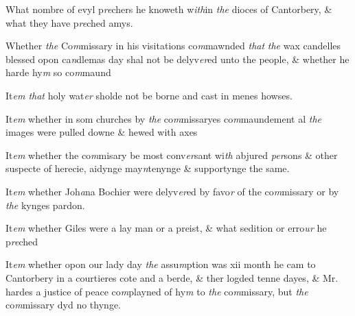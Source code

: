 \documentclass[12pt, a4paper]{book}
\begin{document}
				
					
		\ifthenelse{\isodd{\thepage}}
		{\reversemarginpar}
		{\normalmarginpar}
		What nombre of evyl p\textit{re}chers he knoweth w\textit{ith}in \textit{the} dioces of
						Cantorbery, \& what they have p\textit{re}ched amys.
				
		\ifthenelse{\isodd{\thepage}}
		{\reversemarginpar}
		{\normalmarginpar}
		Whether \textit{the} Co\textit{m}missary in his visitations co\textit{m}mawnded \textit{that}
               \textit{the} wax candelles blessed opon ca\textit{n}dlemas day shal not be
 delyv\textit{er}ed unto the people, \& whether he harde hy\textit{m} so co\textit{m}maund
			

		\ifthenelse{\isodd{\thepage}}
		{\reversemarginpar}
		{\normalmarginpar}
		 It\textit{em that} holy wat\textit{er} sholde not be borne and cast in menes howses.
 
		\ifthenelse{\isodd{\thepage}}
		{\reversemarginpar}
		{\normalmarginpar}
		It\textit{em} whether in som churches by \textit{the} co\textit{m}missaryes co\textit{m}maundement al \textit{the} images were pulled downe \& hewed with
 axes
 
		\ifthenelse{\isodd{\thepage}}
		{\reversemarginpar}
		{\normalmarginpar}
		It\textit{em} whether the co\textit{m}misary be most conv\textit{er}sant wi\textit{th} abjured
 \textit{per}sons \& other suspecte of herecie, aidynge may\textit{n}tenynge
 \& supportynge the same.
            		
		\ifthenelse{\isodd{\thepage}}
		{\reversemarginpar}
		{\normalmarginpar}
		 It\textit{em} whether Joh\textit{a}na Bochier were delyv\textit{er}ed by favo\textit{r} of
 the co\textit{m}missary or by \textit{the} kynges pardon.

		\ifthenelse{\isodd{\thepage}}
		{\reversemarginpar}
		{\normalmarginpar}
		 It\textit{em} whether Giles were a lay man or a preist, \& what
 sedition or erro\textit{ur} he p\textit{re}ched
 
		\ifthenelse{\isodd{\thepage}}
		{\reversemarginpar}
		{\normalmarginpar}
		It\textit{em} whether opon our lady day \textit{the} assu\textit{m}ption was xii month
 	he cam to Cantorbery in a courtieres cote and a berde, \& ther
 	logded tenne dayes, \& Mr. hardes a justice of peace co\textit{m}playned
 of hy\textit{m} to \textit{the} co\textit{m}missary, but \textit{the} co\textit{m}missary dyd no thynge.
            		
\end{document}
